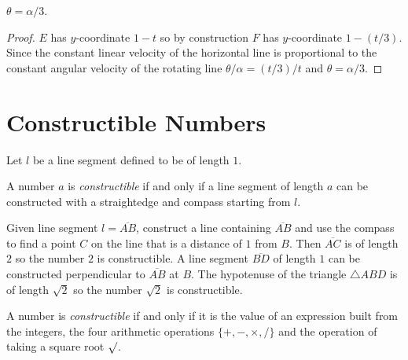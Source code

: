 \begin{theorem}
$\theta = \alpha/3$.
\end{theorem}
\begin{proof}
$E$ has $y$-coordinate $1-t$ so by construction $F$ has $y$-coordinate $1-(t/3)$. Since the constant linear velocity of the horizontal line is proportional to the constant angular velocity of the rotating line $\theta/\alpha = (t/3)/t$ and $\theta = \alpha/3$.
\end{proof}

\newpage

\section{Constructible Numbers}\label{s.trisect-constructible}

Let $l$ be a line segment defined to be of length $1$.

\begin{definition}
A number $a$ is \emph{constructible} if and only if a line segment of length $a$ can be constructed with a straightedge and compass starting from $l$.
\end{definition}

Given line segment $l=\overline{AB}$, construct a line containing $\overline{AB}$ and use the compass to find a point $C$ on the line that is a distance of $1$ from $B$. Then $\overline{AC}$ is of length $2$ so the number $2$ is constructible. A line segment $\overline{BD}$ of length $1$ can be constructed perpendicular to $\overline{AB}$ at $B$. The hypotenuse of the triangle $\triangle ABD$ is of length $\sqrt{2}$ so the number $\sqrt{2}$ is constructible.

\begin{theorem}\label{thm.trisect-constructible}
A number is \emph{constructible} if and only if it is the value of an expression built from the integers, the four arithmetic operations $\{+,-,\times,/\}$ and the operation of taking a square root $\surd$.
\end{theorem}

